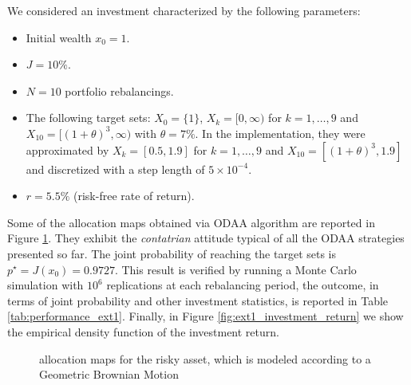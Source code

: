 We considered an investment characterized by the following parameters:
\begin{itemize}
	\item Initial wealth $x_0 = 1$.
	\item $J = 10\%$.
	\item $N = 10$ portfolio rebalancings.
	\item The following target sets: $X_0 = \{1\}$, $X_k = [0,\infty)$ for $k = 1,\ldots,9$ and $X_{10} = [(1+\theta)^3,\infty)$  with $\theta=7\%$. In the implementation, they were approximated by $X_k = [0.5,1.9]$ for $k = 1,\ldots,9$ and $X_{10} = [(1+\theta)^3,1.9]$ and discretized with a step length of $5 \times 10^{-4}$.
	\item $r = 5.5\%$ (risk-free rate of return).
\end{itemize}
Some of the allocation maps obtained via \gls{ODAA} algorithm are reported in Figure \ref{fig:ext1_maps}. They exhibit the \textit{contatrian} attitude typical of all the \gls{ODAA} strategies presented so far. The joint probability of reaching the target sets is $p^{\star}=J(x_0) = 0.9727$. This result is verified by running a Monte Carlo simulation with $10^6$ replications at each rebalancing period, the outcome, in terms of joint probability and other investment statistics, is reported in Table \ref{tab:performance_ext1}. Finally, in Figure \ref{fig:ext1_investment_return} we show the empirical density function of the investment return.




\begin{figure}[H]
	\caption{allocation maps for the risky asset, which is modeled according to a Geometric Brownian Motion }
	\label{fig:ext1_maps}
\end{figure}


